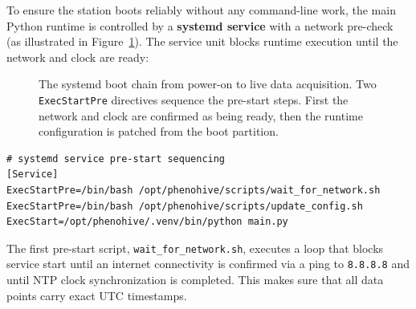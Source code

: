 To ensure the station boots reliably without any command-line work, the main Python runtime is controlled by a \textbf{systemd service} with a network pre-check (as illustrated in Figure~\ref{fig:boot-chain}). The service unit blocks runtime execution until the network and clock are ready:

\begin{figure}[H]
\centering
{}
\caption[Systemd Boot Chain]{The systemd boot chain from power-on to live data acquisition. Two \texttt{ExecStartPre} directives sequence the pre-start steps. First the network and clock are confirmed as being ready, then the runtime configuration is patched from the boot partition.}
\label{fig:boot-chain}
\end{figure}

\begin{verbatim}
# systemd service pre-start sequencing
[Service]
ExecStartPre=/bin/bash /opt/phenohive/scripts/wait_for_network.sh
ExecStartPre=/bin/bash /opt/phenohive/scripts/update_config.sh
ExecStart=/opt/phenohive/.venv/bin/python main.py
\end{verbatim}

The first pre-start script, \texttt{wait\_for\_network.sh}, executes a loop that blocks service start until an internet connectivity is confirmed via a ping to \texttt{8.8.8.8} and until NTP clock synchronization is completed. This makes sure that all data points carry exact UTC timestamps.


